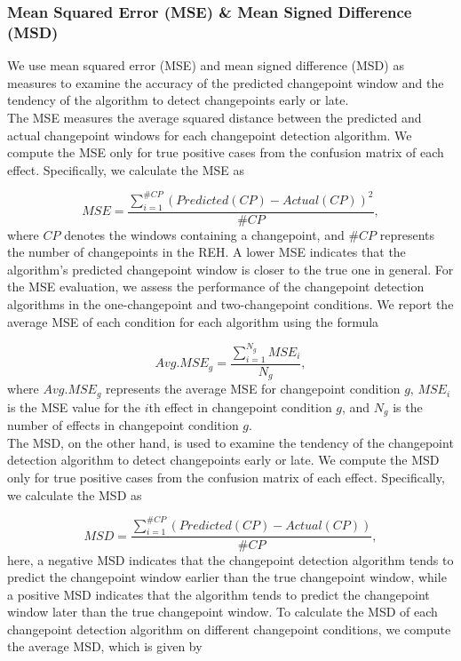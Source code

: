 \documentclass[]{interact}
\theoremstyle{plain}%
\theoremstyle{definition}
\theoremstyle{remark}
\begin{document}
	\subsubsection{Mean Squared Error (MSE) \& Mean Signed Difference (MSD)} \label{sec:MSE MSD}
	
	\hspace{0.28cm} We use mean squared error (MSE) and mean signed difference (MSD) as measures to examine the accuracy of the predicted changepoint window and the tendency of the algorithm to detect changepoints early or late. \\
	
	The MSE measures the average squared distance between the predicted and actual changepoint windows for each changepoint detection algorithm. We compute the MSE only for true positive cases from the confusion matrix of each effect. Specifically, we calculate the MSE as\cite{aminikhanghahiSurveyMethodsTime2017}
	
	\begin{equation} \label{9}
		MSE = \frac{\sum_{i = 1}^{\#CP} (Predicted(CP) - Actual(CP))^2}{\#CP},
	\end{equation}
	where $CP$ denotes the windows containing a changepoint, and $\#CP$ represents the number of changepoints in the REH. A lower MSE indicates that the algorithm's predicted changepoint window is closer to the true one in general. For the MSE evaluation, we assess the performance of the changepoint detection algorithms in the one-changepoint and two-changepoint conditions. We report the average MSE of each condition for each algorithm using the formula
	
	\begin{equation} \label{10}
		Avg.MSE_g = \frac{\sum_{i=1}^{N_g} MSE_i}{N_g},
	\end{equation}
	where $Avg.MSE_g$ represents the average MSE for changepoint condition $g$, $MSE_i$ is the MSE value for the $i$th effect in changepoint condition $g$, and $N_g$ is the number of effects in changepoint condition $g$. \\
	
	The MSD, on the other hand, is used to examine the tendency of the changepoint detection algorithm to detect changepoints early or late. We compute the MSD only for true positive cases from the confusion matrix of each effect. Specifically, we calculate the MSD as
	
	\begin{equation} \label{11}
		MSD = \frac{\sum_{i = 1}^{\#CP} (Predicted(CP) - Actual(CP))}{\#CP},
	\end{equation}
	here, a negative MSD indicates that the changepoint detection algorithm tends to predict the changepoint window earlier than the true changepoint window, while a positive MSD indicates that the algorithm tends to predict the changepoint window later than the true changepoint window. To calculate the MSD of each changepoint detection algorithm on different changepoint conditions, we compute the average MSD, which is given by
	
\end{document}
